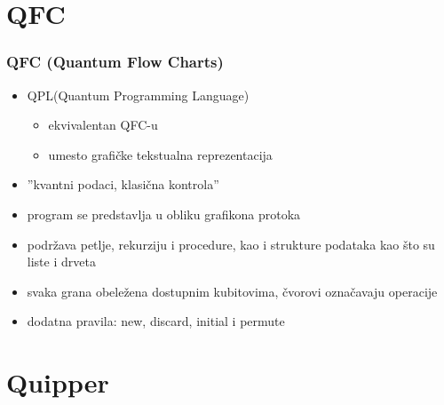 \documentclass[12pt,hyperref={unicode}]{beamer}
\begin{document}
\section{QFC}

\begin{frame}
\frametitle{QFC (Quantum Flow Charts)}
\begin{itemize}
\item{QPL(Quantum Programming Language)}
	\begin{itemize}
	\item{ekvivalentan QFC-u}
    \item{umesto grafičke tekstualna reprezentacija}
	\end{itemize}
\item{''kvantni podaci, klasična kontrola''}\cite{p1}
\item{program se predstavlja u obliku grafikona protoka}
\item{podržava petlje, rekurziju i procedure, kao i strukture podataka kao što su liste i drveta}
\item{svaka grana obeležena dostupnim kubitovima, čvorovi označavaju operacije}
\item{dodatna pravila: new, discard, initial i permute}
\end{itemize}
\end{frame}

\section{Quipper}
\end{document}
